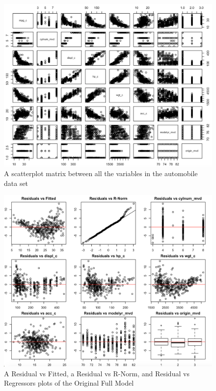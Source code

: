 \documentclass{article}
\begin{document}
\begin{figure}
	\centering
	\includegraphics[width=1\linewidth]{1p_ScPlMtr}
	\caption[Scatterplot Matrix of the Original Full Model]
	{A scatterplot matrix between all the variables in the automobile data set}
\end{figure}

\clearpage
\newpage 

\begin{figure}
	\centering
	\includegraphics[width=1\linewidth]{2-10p_resall}
	\caption[Residual Plots of the Original Full Model]
	{A Residual vs Fitted, a Residual vs R-Norm, and Residual vs Regressors plots of the Original Full Model}
\end{figure}
\end{document}
